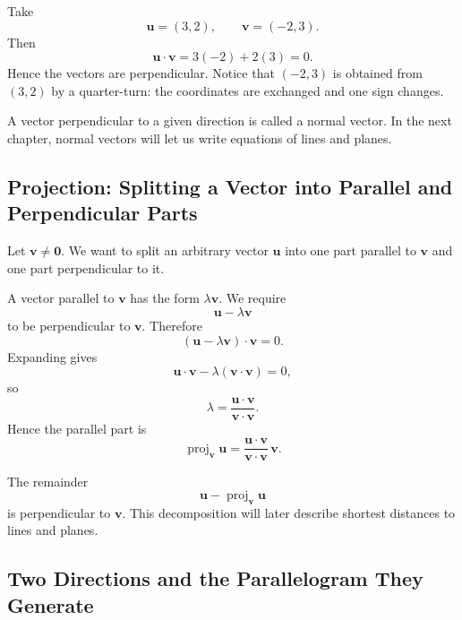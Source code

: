 \begin{examplebox}
Take
\[
\mathbf u=(3,2),
\qquad
\mathbf v=(-2,3).
\]
Then
\[
\mathbf u\cdot\mathbf v
=3(-2)+2(3)=0.
\]
Hence the vectors are perpendicular.  Notice that $(-2,3)$ is obtained from
$(3,2)$ by a quarter-turn: the coordinates are exchanged and one sign changes.
\end{examplebox}

A vector perpendicular to a given direction is called a normal vector.  In the
next chapter, normal vectors will let us write equations of lines and planes.

\subsection{Projection: Splitting a Vector into Parallel and Perpendicular Parts}

Let $\mathbf v\neq\mathbf0$.  We want to split an arbitrary vector $\mathbf u$
into one part parallel to $\mathbf v$ and one part perpendicular to it.

A vector parallel to $\mathbf v$ has the form $\lambda\mathbf v$.  We require
\[
\mathbf u-\lambda\mathbf v
\]
to be perpendicular to $\mathbf v$.  Therefore
\[
(\mathbf u-\lambda\mathbf v)\cdot\mathbf v=0.
\]
Expanding gives
\[
\mathbf u\cdot\mathbf v
-
\lambda(\mathbf v\cdot\mathbf v)=0,
\]
so
\[
\lambda
=
\frac{\mathbf u\cdot\mathbf v}{\mathbf v\cdot\mathbf v}.
\]
Hence the parallel part is
\[
\operatorname{proj}_{\mathbf v}\mathbf u
=
\frac{\mathbf u\cdot\mathbf v}{\mathbf v\cdot\mathbf v}\,\mathbf v.
\]

\begin{center}
\end{center}

The remainder
\[
\mathbf u-
\operatorname{proj}_{\mathbf v}\mathbf u
\]
is perpendicular to $\mathbf v$.  This decomposition will later describe
shortest distances to lines and planes.

\subsection{Two Directions and the Parallelogram They Generate}

